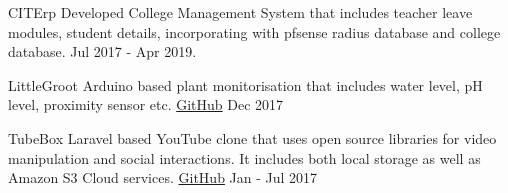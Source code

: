 

\begin{cvhonors}

  \cvhonor
	{CITErp} %
	{Developed College Management System that includes teacher leave modules, student details, incorporating with pfsense radius database and college database.} %
	{} %
	{Jul 2017 - Apr 2019.} %

  \cvhonor
	{LittleGroot} %
	{Arduino based plant monitorisation that includes water level, pH level, proximity sensor etc.} %
	{\href{https://github.com/vijaypurohit/little_groot}{GitHub}} %
	{Dec 2017} %
	 
  \cvhonor
    {TubeBox} %
    {Laravel based YouTube clone that uses open source libraries for video manipulation and social interactions. It includes both local storage as well as Amazon S3 Cloud services.} %
    {\href{https://github.com/vijaypurohit/tubebox}{GitHub}} %
    {Jan - Jul 2017} %

\end{cvhonors}


